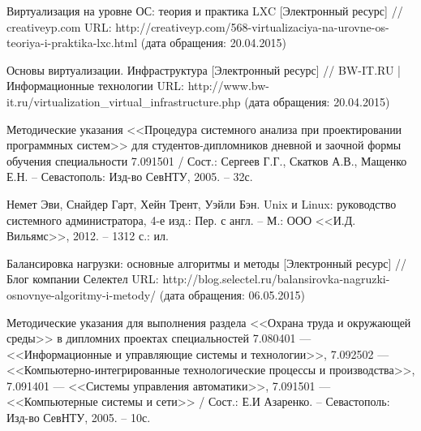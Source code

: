 \begin{thebibliography}{00}
    Виртуализация на уровне ОС: теория и практика LXC
    [Электронный ресурс] //
    creativeyp.com
    URL: http://creativeyp.com/568-virtualizaciya-na-urovne-os-teoriya-i-praktika-lxc.html
    (дата обращения: 20.04.2015)

    Основы виртуализации. Инфраструктура
    [Электронный ресурс] //
    BW-IT.RU | Информационные технологии
    URL: http://www.bw-it.ru/virtualization\_virtual\_infrastructure.php
    (дата обращения: 20.04.2015)

    Методические указания <<Процедура системного анализа при проектировании программных систем>>
    для студентов-дипломников дневной и заочной формы обучения специальности 7.091501 /
    Сост.: Сергеев Г.Г., Скатков А.В., Мащенко Е.Н. -- Севастополь:
    Изд-во СевНТУ, 2005. -- 32с.

    Немет Эви, Снайдер Гарт, Хейн Трент, Уэйли Бэн.
    Unix и Linux: руководство системного администратора,
    4-е изд.: Пер. с англ. -- М.: ООО <<И.Д. Вильямс>>, 2012. --
    1312 с.: ил.

    Балансировка нагрузки: основные алгоритмы и методы
    [Электронный ресурс] //
    Блог компании Селектел
    URL: http://blog.selectel.ru/balansirovka-nagruzki-osnovnye-algoritmy-i-metody/
    (дата обращения: 06.05.2015)

    Методические указания для выполнения раздела <<Охрана труда и окружающей среды>>
    в дипломних проектах специальностей
    7.080401 --- <<Информационные и управляющие системы и технологии>>,
    7.092502 --- <<Компьютерно-интегрированные технологические процессы и производства>>,
    7.091401 --- <<Системы управления автоматики>>,
    7.091501 --- <<Компьютерные системы и сети>> / Сост.: Е.И Азаренко. -- Севастополь:
    Изд-во СевНТУ, 2005. -- 10с.

\end{thebibliography}
\endgroup

\clearpage

